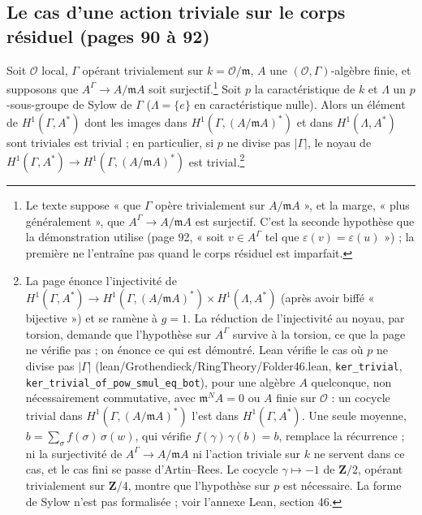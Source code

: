 \documentclass[11pt,a4paper]{article}
\begin{document}
\subsection*{Le cas d'une action triviale sur le corps résiduel (pages 90 à 92)}

Soit $\mathcal{O}$ local, $\Gamma$ opérant trivialement sur $k =
\mathcal{O}/\mathfrak{m}$, $A$ une $(\mathcal{O}, \Gamma)$-algèbre finie, et
supposons que $A^{\Gamma} \to A/\mathfrak{m}A$ soit surjectif.\footnote{Le texte
suppose « que $\Gamma$ opère trivialement sur $A/\mathfrak{m}A$ », et la marge,
« plus généralement », que $A^{\Gamma} \to A/\mathfrak{m}A$ est surjectif. C'est
la seconde hypothèse que la démonstration utilise (page 92, « soit $v \in
A^{\Gamma}$ tel que $\varepsilon(v) = \varepsilon(u)$ ») ; la première ne
l'entraîne pas quand le corps résiduel est imparfait.} Soit $p$ la
caractéristique de $k$ et $\Lambda$ un $p$-sous-groupe de Sylow de $\Gamma$
($\Lambda = \lbrace e\rbrace$ en caractéristique nulle). Alors un élément de
$H^1(\Gamma, A^{*})$ dont les images dans $H^1(\Gamma, (A/\mathfrak{m}A)^{*})$ et
dans $H^1(\Lambda, A^{*})$ sont triviales est trivial ; en particulier, si $p$
ne divise pas $|\Gamma|$, le noyau de $H^1(\Gamma, A^{*}) \to H^1(\Gamma,
(A/\mathfrak{m}A)^{*})$ est trivial.\footnote{La page énonce l'injectivité de
$H^1(\Gamma, A^{*}) \to H^1(\Gamma, (A/\mathfrak{m}A)^{*}) \times H^1(\Lambda,
A^{*})$ (après avoir biffé « bijective ») et se ramène à $g = 1$. La réduction
de l'injectivité au noyau, par torsion, demande que l'hypothèse sur
$A^{\Gamma}$ survive à la torsion, ce que la page ne vérifie pas ; on énonce ce
qui est démontré. Lean vérifie le cas où $p$ ne divise pas $|\Gamma|$
(lean/Grothendieck/RingTheory/Folder46.lean, \texttt{ker\_trivial},
\texttt{ker\_trivial\_of\_pow\_smul\_eq\_bot}), pour une algèbre $A$
quelconque, non nécessairement commutative, avec $\mathfrak{m}^{N}A = 0$ ou
$A$ finie sur $\mathcal{O}$ : un cocycle trivial dans $H^1(\Gamma,
(A/\mathfrak{m}A)^{*})$ l'est dans $H^1(\Gamma, A^{*})$. Une seule moyenne,
$b = \sum_{\sigma} f(\sigma)\,\sigma(w)$, qui vérifie $f(\gamma)\,\gamma(b) =
b$, remplace la récurrence ; ni la surjectivité de $A^{\Gamma} \to
A/\mathfrak{m}A$ ni l'action triviale sur $k$ ne servent dans ce cas, et le
cas fini se passe d'Artin--Rees. Le cocycle $\gamma \mapsto -1$ de
$\mathbf{Z}/2$, opérant trivialement sur $\mathbf{Z}/4$, montre que
l'hypothèse sur $p$ est nécessaire. La forme de Sylow n'est pas formalisée ;
voir l'annexe Lean, section 46.}
\end{document}
